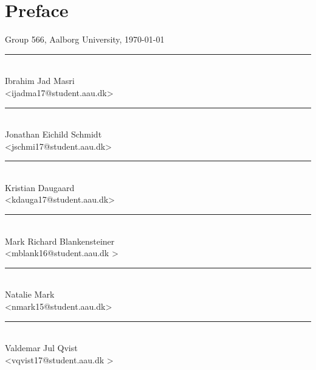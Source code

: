 \chapter*{Preface}\label{ch:prefacev}

\vspace{\baselineskip}\hfill Group {566}, Aalborg University, \today
\vfill\noindent


\begin{minipage}[b]{0.45\textwidth}
    \centering
    \rule{\textwidth}{0.5pt}\\
    Ibrahim Jad Masri\\
    {\footnotesize <ijadma17@student.aau.dk>}
\end{minipage}
\hfill
\vspace{3\baselineskip}
\begin{minipage}[b]{0.45\textwidth}
    \centering
    \rule{\textwidth}{0.5pt}\\
    Jonathan Eichild Schmidt\\
    {\footnotesize <jschmi17@student.aau.dk>}
\end{minipage}

\begin{minipage}[b]{0.45\textwidth}
    \centering
    \rule{\textwidth}{0.5pt}\\
     Kristian Daugaard\\
    {\footnotesize <kdauga17@student.aau.dk>}
\end{minipage}
\hfill
    \vspace{3\baselineskip}
    \begin{minipage}[b]{0.45\textwidth}
        \centering
        \rule{\textwidth}{0.5pt}\\
       Mark Richard Blankensteiner\\
        {\footnotesize <mblank16@student.aau.dk >}
    \end{minipage}

\begin{minipage}[b]{0.45\textwidth}
    \centering
    \rule{\textwidth}{0.5pt}\\
     Natalie Mark\\
    {\footnotesize <nmark15@student.aau.dk>}
\end{minipage}
\hfill
    \vspace{3\baselineskip}
    \begin{minipage}[b]{0.45\textwidth}
    \centering
    \rule{\textwidth}{0.5pt}\\
    Valdemar Jul Qvist\\
    {\footnotesize <vqvist17@student.aau.dk >}
 \end{minipage}